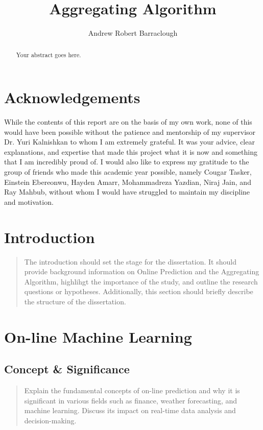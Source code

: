 \documentclass[11pt]{article} %
\title{Aggregating Algorithm}
\author{Andrew Robert Barraclough}
\theoremstyle{plain}
\theoremstyle{definition}
\begin{document}
\maketitle

\declaration

\begin{abstract}
  Your abstract goes here.
\end{abstract}

\section*{Acknowledgements}
While the contents of this report are on the basis of my own work, none of this would have been possible without the patience and mentorship of my supervisor Dr. Yuri Kalnishkan to whom I am extremely grateful. It was your advice, clear explanations, and expertise that made this project what it is now and something that I am incredibly proud of.
I would also like to express my gratitude to the group of friends who made this academic year possible, namely Cougar Tasker, Einstein Ebereonwu, Hayden Amarr, Mohammadreza Yazdian, Niraj Jain, and Ray Mahbub, without whom I would have struggled to maintain my discipline and motivation.
\newpage

\section{Introduction}
\begin{quote}
  The introduction should set the stage for the dissertation. It should provide background information on Online Prediction and the Aggregating Algorithm, highlihgt the importance of the study, and outline the research questions or hypotheses. Additionally, this section should briefly describe the structure of the dissertation.
\end{quote}

\newpage

\section{On-line Machine Learning}
\subsection{Concept \& Significance}
\begin{quote}
  Explain the fundamental concepts of on-line prediction and why it is significant in various fields such as finance, weather forecasting, and machine learning. Discuss its impact on real-time data analysis and decision-making.
\end{quote}
\end{document}
